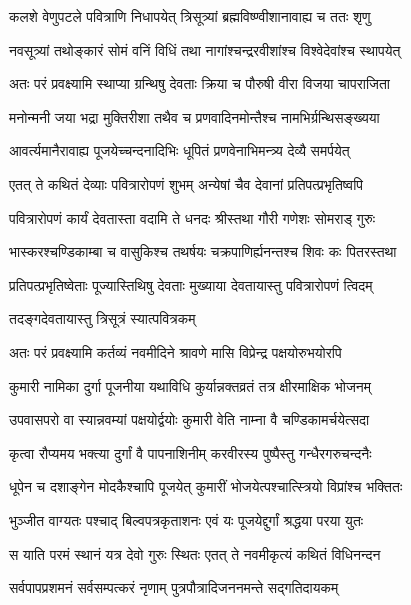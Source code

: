 \twolineshloka
{कलशे वेणुपटले पवित्राणि निधापयेत्}
{त्रिसूत्र्यां ब्रह्मविष्ण्वीशानावाह्य च ततः शृणु} %

\twolineshloka
{नवसूत्र्यां तथोङ्कारं सोमं वनिं विधिं तथा}
{नागांश्चन्द्ररवीशांश्च विश्वेदेवांश्च स्थापयेत्} %

\twolineshloka
{अतः परं प्रवक्ष्यामि स्थाप्या ग्रन्थिषु देवताः}
{क्रिया च पौरुषी वीरा विजया चापराजिता} %

\twolineshloka
{मनोन्मनी जया भद्रा मुक्तिरीशा तथैव च}
{प्रणवादिनमोन्तैश्च नामभिर्ग्रन्थिसङ्ख्यया} %

\twolineshloka
{आवर्त्यमानैरावाह्य पूजयेच्चन्दनादिभिः}
{धूपितं प्रणवेनाभिमन्त्र्य देव्यै समर्पयेत्} %

\twolineshloka
{एतत् ते कथितं देव्याः पवित्रारोपणं शुभम्}
{अन्येषां चैव देवानां प्रतिपत्प्रभृतिष्वपि} %

\twolineshloka
{पवित्रारोपणं कार्यं देवतास्ता वदामि ते}
{धनदः श्रीस्तथा गौरी गणेशः सोमराड् गुरुः} %

\twolineshloka
{भास्करश्चण्डिकाम्बा च वासुकिश्च तथर्षयः}
{चक्रपाणिर्ह्यनन्तश्च शिवः कः पितरस्तथा} %

\twolineshloka
{प्रतिपत्प्रभृतिष्वेताः पूज्यास्तिथिषु देवताः}
{मुख्याया देवतायास्तु पवित्रारोपणं त्विदम्} %

\onelineshloka
{तदङ्गदेवतायास्तु त्रिसूत्रं स्यात्पवित्रकम्} %


\twolineshloka
{अतः परं प्रवक्ष्यामि कर्तव्यं नवमीदिने}
{श्रावणे मासि विप्रेन्द्र पक्षयोरुभयोरपि} %

\twolineshloka
{कुमारी नामिका दुर्गा पूजनीया यथाविधि}
{कुर्यान्नक्तव्रतं तत्र क्षीरमाक्षिक भोजनम् } %

\twolineshloka
{उपवासपरो वा स्यान्नवम्यां पक्षयोर्द्वयोः}
{कुमारी वेति नाम्ना वै चण्डिकामर्चयेत्सदा} %

\twolineshloka
{कृत्वा रौप्यमय भक्त्या दुर्गां वै पापनाशिनीम्}
{करवीरस्य पुष्पैस्तु गन्धैरगरुचन्दनैः} %

\twolineshloka
{धूपेन च दशाङ्गेन मोदकैश्चापि पूजयेत्}
{कुमारीं भोजयेत्पश्चात्स्त्रियो विप्रांश्च भक्तितः} %

\twolineshloka
{भुञ्जीत वाग्यतः पश्चाद् बिल्वपत्रकृताशनः}
{एवं यः पूजयेद्दुर्गां श्रद्धया परया युतः} %

\twolineshloka
{स याति परमं स्थानं यत्र देवो गुरुः स्थितः}
{एतत् ते नवमीकृत्यं कथितं विधिनन्दन} %

\onelineshloka
{सर्वपापप्रशमनं सर्वसम्पत्करं नृणाम् पुत्रपौत्रादिजननमन्ते सद्गतिदायकम्} %


